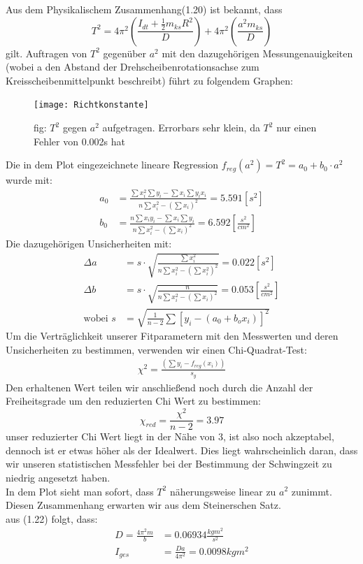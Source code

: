 \documentclass[11pt,a4paper]{article}
\begin{document}
	Aus dem Physikalischem Zusammenhang(1.20) ist bekannt, dass
	\begin{equation}
		T^2 = 4 \pi^2 \left(\frac{I_{dt}+ \frac{1}{2} m_{ks}R^2}{D}\right) +4\pi^2 \left(\frac{a^2m_{ks}}{D}\right)
	\end{equation}
	gilt.
	Auftragen von $T^2$ gegenüber $a^2$ mit den dazugehörigen Messungenauigkeiten (wobei a den Abstand der Drehscheibenrotationsachse zum Kreisscheibenmittelpunkt beschreibt) führt zu folgendem Graphen:\\
	\begin{figure}[H]
	\texttt{[image: Richtkonstante]}
	\caption[]{fig: $T^2$ gegen $a^2$ aufgetragen. Errorbars sehr klein, da $T^2$ nur einen Fehler von 0.002s hat}
	\end{figure}
	Die in dem Plot eingezeichnete lineare Regression $f_{reg}(a^2)=T^2=a_0 + b_0 \cdot a^2$ wurde mit:
	\begin{align}
	a_0 &= \frac{\sum x_i^2 \sum y_i -\sum x_i \sum y_i x_i}{n\sum x_i^2 -(\sum x_i)^2}=5.591[s^2]\\
	b_0 &= \frac{n \sum x_i y_i - \sum x_i \sum y_i}{n \sum x_i^2 - (\sum x_i)^2}=6.592 [\frac{s^2}{cm^2}]
	\end{align}
	Die dazugehörigen Unsicherheiten mit:
	\begin{align}
	\Delta a &= s \cdot \sqrt{\frac{\sum x_i^2}{n \sum x_i^2 - (\sum x_i^2)^2}}=0.022[s^2]\\
	\Delta b &= s \cdot \sqrt{\frac{n}{n \sum x_i^2 - (\sum x_i)^2}}=0.053[\frac{s^2}{cm^2}]\\
	 \text{wobei  } s&=\sqrt{\frac{1}{n-2} \sum [y_i -( a_0 + b_o x_i)]^2}
	\end{align}
	Um die Verträglichkeit unserer Fitparametern mit den Messwerten und deren Unsicherheiten zu bestimmen,
	verwenden wir einen Chi-Quadrat-Test:
	\begin{align}
	\chi ^2 = \frac{(\sum y_i - f_{reg}(x_i))}{s_y}
	\end{align}
	Den erhaltenen Wert teilen wir anschließend noch durch die Anzahl der Freiheitsgrade um den reduzierten Chi Wert zu bestimmen:
	$$\chi _{red} = \frac{\chi ^2 }{n-2} =3.97$$
	unser reduzierter Chi Wert liegt in der Nähe von 3, ist also noch akzeptabel, dennoch ist er etwas höher als der Idealwert.
	Dies liegt wahrscheinlich daran, dass wir unseren statistischen Messfehler bei der Bestimmung der Schwingzeit zu niedrig angesetzt haben.\vspace{2cm}\\
	In dem Plot sieht man sofort, dass $T^2$ näherungsweise linear zu $a^2$ zunimmt. Diesen Zusammenhang erwarten wir aus dem Steinerschen Satz.
	\\
	aus (1.22) folgt, dass:
	\begin{align}
	D=\frac{4 \pi ^2 m}{b}&=0.06934 \frac{kg m^2}{s^2}\\
	I_{ges}&= \frac{Da}{4 \pi^2} =0.0098 kg m^2
	\end{align}
	
\end{document}
